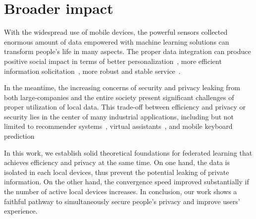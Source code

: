 
\section{Broader impact}
With the widespread use of mobile devices, the powerful sensors
collected enormous amount of data empowered with machine learning
solutions can transform people's life in many aspects. The proper
data integration can produce positive social
impact in terms of better personalization~\cite{fallah2020personalized}, more efficient information solicitation~\cite{chen2018federated}, more robust and stable service~\cite{47586}.

In the meantime, the increasing concerns of security and
privacy leaking from both large-companies and the entire society
present significant challenges of proper utilization of local
data. This trade-off between efficiency and privacy or security
lies in the center of many industrial applications, including 
but not limited to recommender systems~\cite{chen2018federated}, virtual assistants~\cite{lamautonomy}, and mobile keyboard prediction~\cite{47586}

In this work, we establish solid theoretical foundations for federated
learning that achieves efficiency and privacy at the same time. 
On one hand, the data is isolated in each local devices, thus prevent
the potential leaking of private information. On the other hand, the
convergence speed improved substantially if the number of
active local devices increases. In conclusion, our work 
shows a faithful pathway to simultaneously secure people's privacy and improve
users' experience.



